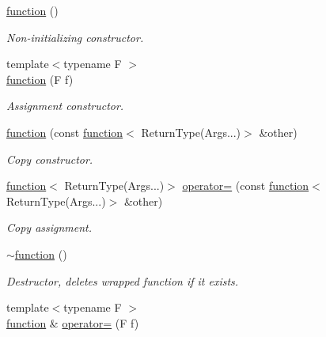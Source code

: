 \begin{DoxyCompactItemize}
\item 
\mbox{\hyperlink{classr2k_1_1function_3_01_return_type_07_args_8_8_8_08_4_a6debd7d4891b02d8b6c2a911a0c6e189}{function}} ()
\begin{DoxyCompactList}\small\item\em Non-\/initializing constructor. \end{DoxyCompactList}\item 
{\footnotesize template$<$typename F $>$ }\\\mbox{\hyperlink{classr2k_1_1function_3_01_return_type_07_args_8_8_8_08_4_aa189d3ee19c29f32a37d3e2bdb02ac03}{function}} (F f)
\begin{DoxyCompactList}\small\item\em Assignment constructor. \end{DoxyCompactList}\item 
\mbox{\hyperlink{classr2k_1_1function_3_01_return_type_07_args_8_8_8_08_4_ad909b2ac9f0919b36e42d29b57be2fe4}{function}} (const \mbox{\hyperlink{classr2k_1_1function}{function}}$<$ Return\+Type(Args...)$>$ \&other)
\begin{DoxyCompactList}\small\item\em Copy constructor. \end{DoxyCompactList}\item 
\mbox{\hyperlink{classr2k_1_1function}{function}}$<$ Return\+Type(Args...)$>$ \mbox{\hyperlink{classr2k_1_1function_3_01_return_type_07_args_8_8_8_08_4_a21dc31814c435695629e3768d920bcf1}{operator=}} (const \mbox{\hyperlink{classr2k_1_1function}{function}}$<$ Return\+Type(Args...)$>$ \&other)
\begin{DoxyCompactList}\small\item\em Copy assignment. \end{DoxyCompactList}\item 
\mbox{\label{classr2k_1_1function_3_01_return_type_07_args_8_8_8_08_4_adc57ef3c2fd99d018dbebb3772daf00d}} 
\mbox{\hyperlink{classr2k_1_1function_3_01_return_type_07_args_8_8_8_08_4_adc57ef3c2fd99d018dbebb3772daf00d}{$\sim$function}} ()
\begin{DoxyCompactList}\small\item\em Destructor, deletes wrapped function if it exists. \end{DoxyCompactList}\item 
{\footnotesize template$<$typename F $>$ }\\\mbox{\hyperlink{classr2k_1_1function}{function}} \& \mbox{\hyperlink{classr2k_1_1function_3_01_return_type_07_args_8_8_8_08_4_a7df10ce8c78ec53aaad6835aa5498892}{operator=}} (F f)

\end{DoxyCompactItemize}
